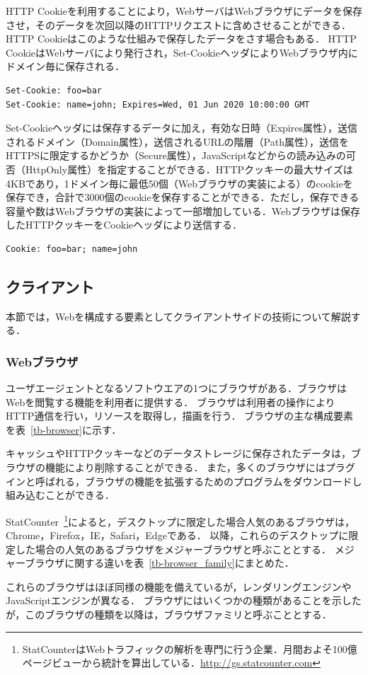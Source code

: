 HTTP Cookieを利用することにより，WebサーバはWebブラウザにデータを保存させ，そのデータを次回以降のHTTPリクエストに含めさせることができる．HTTP Cookieはこのような仕組みで保存したデータをさす場合もある．
HTTP CookieはWebサーバにより発行され，Set-CookieヘッダによりWebブラウザ内にドメイン毎に保存される．
\begin{verbatim}
Set-Cookie: foo=bar
Set-Cookie: name=john; Expires=Wed, 01 Jun 2020 10:00:00 GMT
\end{verbatim}
Set-Cookieヘッダには保存するデータに加え，有効な日時（Expires属性），送信されるドメイン（Domain属性），送信されるURLの階層（Path属性），送信をHTTPSに限定するかどうか（Secure属性），JavaScriptなどからの読み込みの可否（HttpOnly属性）を指定することができる．HTTPクッキーの最大サイズは4KBであり，1ドメイン毎に最低50個（Webブラウザの実装による）のcookieを保存でき，合計で3000個のcookieを保存することができる．ただし，保存できる容量や数はWebブラウザの実装によって一部増加している．Webブラウザは保存したHTTPクッキーをCookieヘッダにより送信する．
\begin{verbatim}
Cookie: foo=bar; name=john
\end{verbatim}
\subsection{クライアント}
本節では，Webを構成する要素としてクライアントサイドの技術について解説する．
\subsubsection{Webブラウザ}
ユーザエージェントとなるソフトウエアの1つにブラウザがある．ブラウザはWebを閲覧する機能を利用者に提供する．
ブラウザは利用者の操作によりHTTP通信を行い，リソースを取得し，描画を行う．
ブラウザの主な構成要素を表~\ref{tb-browser}に示す．

キャッシュやHTTPクッキーなどのデータストレージに保存されたデータは，ブラウザの機能により削除することができる． 
また，多くのブラウザにはプラグインと呼ばれる，ブラウザの機能を拡張するためのプログラムをダウンロードし組み込むことができる．

StatCounter~\footnote{StatCounterはWebトラフィックの解析を専門に行う企業．月間およそ100億ページビューから統計を算出している．\url{http://gs.statcounter.com}}によると，デスクトップに限定した場合人気のあるブラウザは，Chrome，Firefox，IE，Safari，Edgeである．
以降，これらのデスクトップに限定した場合の人気のあるブラウザをメジャーブラウザと呼ぶこととする．
メジャーブラウザに関する違いを表~\ref{tb-browser_family}にまとめた．

これらのブラウザはほぼ同様の機能を備えているが，レンダリングエンジンやJavaScriptエンジンが異なる．
ブラウザにはいくつかの種類があることを示したが，このブラウザの種類を以降は，ブラウザファミリと呼ぶこととする．
